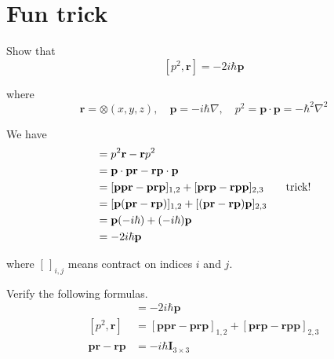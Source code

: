 

\section*{Fun trick}

Show that
\begin{equation*}
\left[p^2,\mathbf r\right]=-2i\hbar\mathbf p
\end{equation*}

where
\begin{equation*}
\mathbf r=\otimes(x,y,z),\quad
\mathbf p=-i\hbar\nabla,\quad
p^2=\mathbf p\cdot\mathbf p=-\hbar^2\nabla^2
\end{equation*}

We have
\begin{align*}
[p^2,\mathbf r]
&=p^2\mathbf r-\mathbf rp^2
\\
&=\mathbf p\cdot\mathbf p\mathbf r-\mathbf r \mathbf p\cdot\mathbf p
\\
&=[\mathbf p\mathbf p\mathbf r-\mathbf p\mathbf r\mathbf p]_{1,2}
+[\mathbf p\mathbf r\mathbf p-\mathbf r\mathbf p\mathbf p]_{2,3}
\tag*{\text{trick!}}
\\
&=[\mathbf p(\mathbf{pr}-\mathbf{rp})]_{1,2}+[(\mathbf{pr}-\mathbf{rp})\mathbf p]_{2,3}
\\
&=\mathbf p(-i\hbar)+(-i\hbar)\mathbf p
\\
&=-2i\hbar\mathbf p
\end{align*}

where $[\,]_{i,j}$ means contract on indices $i$ and $j$.

\bigskip
Verify the following formulas.
\begin{align*}
[p^2,\mathbf r]
&=-2i\hbar\mathbf p
\tag{1}
\\[1ex]
[p^2,\mathbf r]
&=[\mathbf p\mathbf p\mathbf r-\mathbf p\mathbf r\mathbf p]_{1,2}
+[\mathbf p\mathbf r\mathbf p-\mathbf r\mathbf p\mathbf p]_{2,3}
\tag{2}
\\[1ex]
\mathbf p\mathbf r-\mathbf r\mathbf p&=-i\hbar\mathbf I_{3\times3}
\tag{3}
\end{align*}



